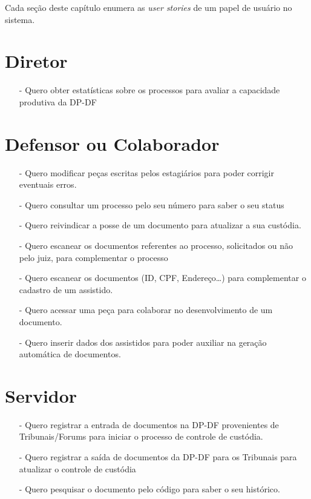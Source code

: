\documentclass[12pt,a4paper]{report}
\begin{document}
Cada seção deste capítulo enumera as \textit{user stories} de um papel de usuário no sistema.

\section{Diretor}
\begin{itemize}
\item[-] Quero obter estatísticas sobre os processos para avaliar a capacidade produtiva da DP-DF
\end{itemize}

\section{Defensor ou Colaborador}
\begin{itemize}
\item[-] Quero modificar peças escritas pelos estagiários para poder corrigir eventuais erros.
\item[-] Quero consultar um processo pelo seu número para saber o seu status
\item[-] Quero reivindicar a posse de um documento para atualizar a sua custódia.
\item[-] Quero escanear os documentos referentes ao processo, solicitados ou não pelo juiz, para complementar o processo
\item[-] Quero escanear os documentos (ID, CPF, Endereço…) para complementar o cadastro de um assistido.
\item[-] Quero acessar uma peça para colaborar no desenvolvimento de um documento.
\item[-] Quero inserir dados dos assistidos para poder auxiliar na geração automática de documentos.
\end{itemize}

\section{Servidor}
\begin{itemize}
\item[-] Quero registrar a entrada de documentos na DP-DF provenientes de Tribunais/Forums para iniciar o processo de controle de custódia.
\item[-] Quero registrar a saída de documentos da DP-DF para os Tribunais para atualizar o controle de custódia
\item[-] Quero pesquisar o documento pelo código para saber o seu histórico.
\end{itemize}
\end{document}
